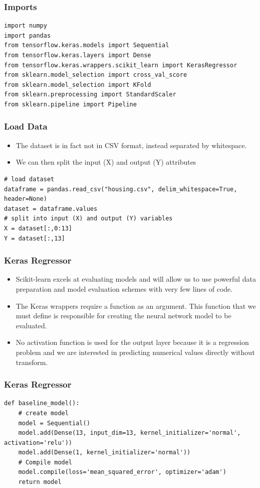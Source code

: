 \begin{frame}[fragile] \frametitle{Imports}
\begin{lstlisting}
import numpy
import pandas
from tensorflow.keras.models import Sequential
from tensorflow.keras.layers import Dense
from tensorflow.keras.wrappers.scikit_learn import KerasRegressor
from sklearn.model_selection import cross_val_score
from sklearn.model_selection import KFold
from sklearn.preprocessing import StandardScaler
from sklearn.pipeline import Pipeline
\end{lstlisting}
\end{frame}

\begin{frame}[fragile] \frametitle{Load Data}
 \begin{itemize}
 \item The dataset is in fact not in CSV format, instead separated by whitespace. 
 \item We can then split the input (X) and output (Y) attributes
 \end{itemize}
\begin{lstlisting}
# load dataset
dataframe = pandas.read_csv("housing.csv", delim_whitespace=True, header=None)
dataset = dataframe.values
# split into input (X) and output (Y) variables
X = dataset[:,0:13]
Y = dataset[:,13]
\end{lstlisting}
\end{frame}


\begin{frame}[fragile] \frametitle{Keras Regressor}
 \begin{itemize}
 \item Scikit-learn excels at evaluating models and will allow us to use powerful data preparation and model evaluation schemes with very few lines of code.
 \item The Keras wrappers require a function as an argument. This function that we must define is responsible for creating the neural network model to be evaluated.
 \item No activation function is used for the output layer because it is a regression problem and we are interested in predicting numerical values directly without transform.
 \end{itemize}
\end{frame}


\begin{frame}[fragile] \frametitle{Keras Regressor}
 \begin{lstlisting}
def baseline_model():
	# create model
	model = Sequential()
	model.add(Dense(13, input_dim=13, kernel_initializer='normal', activation='relu'))
	model.add(Dense(1, kernel_initializer='normal'))
	# Compile model
	model.compile(loss='mean_squared_error', optimizer='adam')
	return model
\end{lstlisting}
\end{frame}


